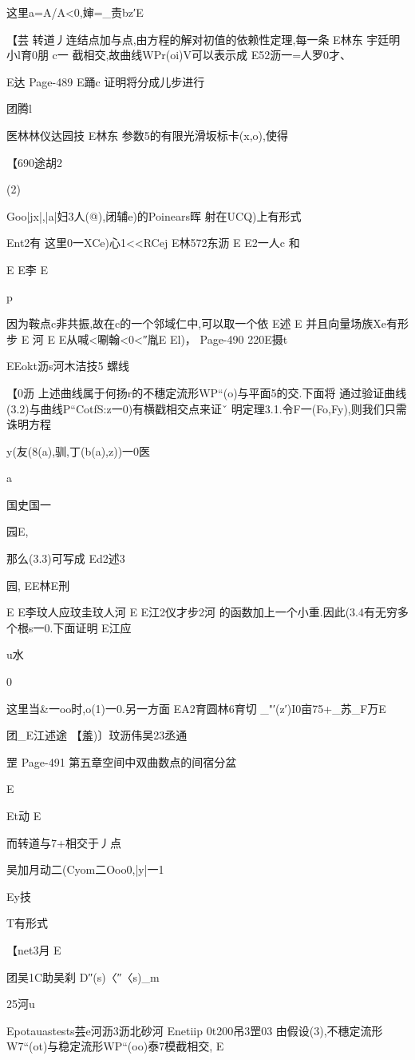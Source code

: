 {{{这里a=A/A<0,婶=_责bz′E

【芸
转道丿连结点加与点,由方程的解对初值的依赖性定理,每一条
E林东
宇廷明小l育0朋
c一
截相交,故曲线WPr(oi)V可以表示成
E52沥一=人罗0才、

E达
Page-489
E踊c
证明将分成儿步进行

团腾l

医林林仪达园技
E林东
参数5的有限光滑坂标卡(x,o),使得

【690途胡2

(2){Goo|jx|,|a|妇3人(@),闭辅e)的Poinears晖
射在UCQ)上有形式

Ent2有
这里0一XCe)心1<<RCej
E林572东沥
E
E2一人c
和

E
E李
E

p

因为鞍点c非共振,故在c的一个邻域仁中,可以取一个依
E述
E
并且向量场族Xe有形步
E
河
E
E从喊<唰翰<0<″胤E
El)，
Page-490
220E摄t

EEokt沥s河木洁技5
螺线

【0沥
上述曲线属于何扬r的不穗定流形WP“(o)与平面5的交.下面将
通过验证曲线(3.2)与曲线P“CotfS:z一0)有横戳相交点来证ˇ
明定理3.1.令F一(Fo,Fy),则我们只需诛明方程

y(友(8(a),驯,丁(b(a),z))一0医

a

国史国一

园E,

那么(3.3)可写成
Ed2述3

园,
EE林E刑

E
E李玟人应玟圭玟人河
E
E江2仪才步2河
的函数加上一个小重.因此(3.4有无穷多个根s一0.下面证明
E江应

u水

0

这里当&一oo时,o(1)一0.另一方面
EA2育圆林6育切
_"′(z′)I0亩75+_苏_F万E

团_E江述途
【羞)〕玟沥伟吴23丞通

罡
Page-491
第五章空间中双曲数点的间宿分盆

E

Et动
E

而转道与7+相交于丿点

吴加月动二(Cyom二Ooo0,|y|一1

Ey技

T有形式

【net3月
E

团吴1C助吴刹
D″(s)〈″〈s)_m

25河u

Epotauastests芸e河沥3沥北砂河
Enetiip
0t200吊3罡03
由假设(3),不穗定流形W7“(ot)与稳定流形WP“(oo)泰7模截相交,
E

}}}}
